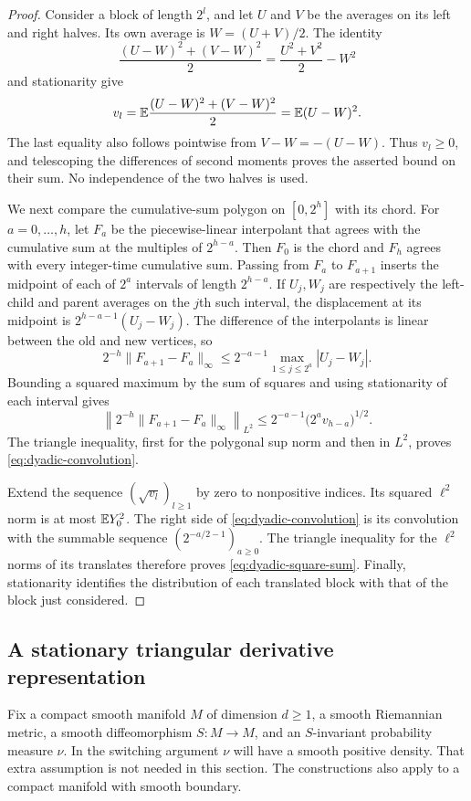 \begin{proof}
Consider a block of length $2^l$, and let $U$ and $V$ be the averages on
its left and right halves.  Its own average is $W=(U+V)/2$.  The identity
\[
 \frac{(U-W)^2+(V-W)^2}{2}
   =\frac{U^2+V^2}{2}-W^2
\]
and stationarity give
\[
 v_l
 =\mathbb E\frac{(U-W)^2+(V-W)^2}{2}
 =\mathbb E(U-W)^2.
\]
The last equality also follows pointwise from $V-W=-(U-W)$.
Thus $v_l\geq0$, and telescoping the differences of second moments proves
the asserted bound on their sum.  No independence of the two halves is
used.

We next compare the cumulative-sum polygon on $[0,2^h]$ with its chord.
For $a=0,\ldots,h$, let $F_a$ be the piecewise-linear interpolant that
agrees with the cumulative sum at the multiples of $2^{h-a}$.
Then $F_0$ is the chord and $F_h$ agrees with every integer-time
cumulative sum.  Passing from $F_a$ to $F_{a+1}$ inserts the midpoint
of each of $2^a$ intervals of length $2^{h-a}$.
If $U_j,W_j$ are respectively the left-child and parent averages on
the $j$th such interval, the displacement at its midpoint is
$2^{h-a-1}(U_j-W_j)$.
The difference of the interpolants is linear between the old and new
vertices, so
\[
 2^{-h}\|F_{a+1}-F_a\|_\infty
 \leq 2^{-a-1}\max_{1\leq j\leq 2^a}|U_j-W_j|.
\]
Bounding a squared maximum by the sum of squares and using stationarity
of each interval gives
\[
 \left\|2^{-h}\|F_{a+1}-F_a\|_\infty\right\|_{L^2}
 \leq 2^{-a-1}\bigl(2^a v_{h-a}\bigr)^{1/2}.
\]
The triangle inequality, first for the polygonal sup norm and then in
$L^2$, proves \eqref{eq:dyadic-convolution}.

Extend the sequence $(\sqrt{v_l})_{l\geq1}$ by zero to nonpositive
indices.  Its squared $\ell^2$ norm is at most $\mathbb E Y_0^2$.
The right side of \eqref{eq:dyadic-convolution} is its convolution
with the summable sequence $(2^{-a/2-1})_{a\geq0}$.
The triangle inequality for the $\ell^2$ norms of its translates
therefore proves \eqref{eq:dyadic-square-sum}.
Finally, stationarity identifies the distribution of each translated
block with that of the block just considered.
\end{proof}

\subsection{A stationary triangular derivative representation}

Fix a compact smooth manifold $M$ of dimension $d\geq1$, a smooth
Riemannian metric, a smooth diffeomorphism $S:M\to M$, and an
$S$-invariant probability measure $\nu$.  In the switching argument
$\nu$ will have a smooth positive density.  That extra assumption is
not needed in this section.  The constructions also apply to a compact
manifold with smooth boundary.

